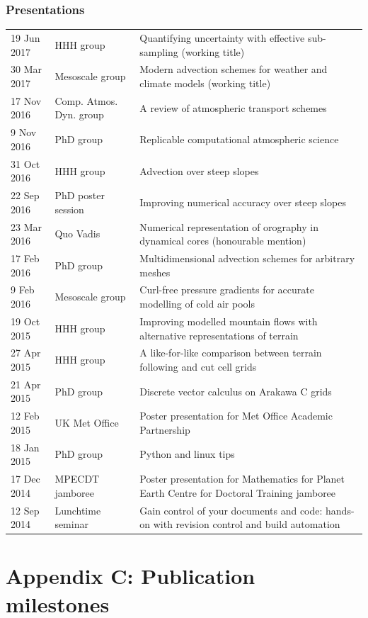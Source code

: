 \documentclass[a4paper,11pt]{article}
\begin{document}
\subsubsection*{Presentations}
\begin{tabularx}{\linewidth}{l l X}
19 Jun 2017 & HHH group & Quantifying uncertainty with effective sub-sampling (working title) \\
30 Mar 2017 & Mesoscale group & Modern advection schemes for weather and climate models (working title) \\
17 Nov 2016 & Comp. Atmos. Dyn. group & A review of atmospheric transport schemes \\
9 Nov 2016 & PhD group & Replicable computational atmospheric science \\
31 Oct 2016 & HHH group & Advection over steep slopes \\
22 Sep 2016 & PhD poster session & Improving numerical accuracy over steep slopes \\
23 Mar 2016 & Quo Vadis & Numerical representation of orography in dynamical cores (honourable mention) \\
17 Feb 2016 & PhD group & Multidimensional advection schemes for arbitrary meshes \\
9 Feb 2016 & Mesoscale group & Curl-free pressure gradients for accurate modelling of cold air pools \\
19 Oct 2015 & HHH group & Improving modelled mountain flows with alternative representations of terrain \\
27 Apr 2015 & HHH group & A like-for-like comparison between terrain following and cut cell grids \\
21 Apr 2015 & PhD group & Discrete vector calculus on Arakawa C grids \\
12 Feb 2015 & UK Met Office & Poster presentation for Met Office Academic Partnership \\
18 Jan 2015 & PhD group & Python and linux tips \\
17 Dec 2014 & MPECDT jamboree & Poster presentation for Mathematics for Planet Earth Centre for Doctoral Training jamboree \\
12 Sep 2014 & Lunchtime seminar  & Gain control of your documents and code: hands-on with revision control and build automation \\
\end{tabularx}

\section*{Appendix C: Publication milestones}
\end{document}
